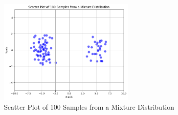 \documentclass[letter]{article}
\theoremstyle{definition}
\newenvironment{soln}{
	\leavevmode\color{black}\ignorespaces
}{}
\begin{document}
\begin{enumerate}
		\begin{soln}
		

            \begin{figure}[H]
                \centering
                \includegraphics[width=0.6\textwidth]{probability-2.png} %
                \caption{Scatter Plot of 100 Samples from a Mixture                              Distribution}
                \label{fig:scatter_plot}
            \end{figure}
	\end{soln}
	\end{enumerate}
	
	
	
	
	
	
	
\end{document}
